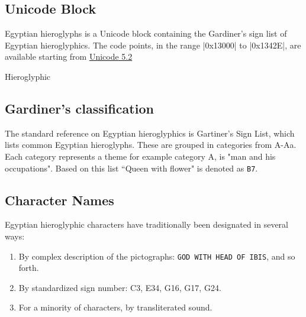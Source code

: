 \ifluatex
\bgroup
\centering 
\aegyptus
\scalebox{7}{\char"F300C}
\scalebox{7}{\char"F3001}
\scalebox{7}{\char"F3010}
\scalebox{7}{\char"F308B}
\scalebox{7}{\char"F3097}
\scalebox{7}{\char"F3091}
\egroup

\fi


\subsection{Unicode Block}

Egyptian hieroglyphs is a Unicode block containing the Gardiner's sign list of Egyptian hieroglyphics.
The code points, in the range |0x13000| to |0x1342E|, are available starting from
\href{http://unicode.org/charts/PDF/U13000.pdf}{Unicode 5.2}

\begin{scriptexample}[]{Hieroglyphic}
\bgroup
{}
\egroup
\end{scriptexample}

\subsection{Gardiner's classification}

The standard reference on Egyptian hieroglyphics is Gartiner's Sign List, which lists common Egyptian hieroglyphs. These are grouped in categories from A-Aa. Each category represents a theme for example category A, is "man and his occupations". Based on this list ``Queen with flower" is denoted as \texttt{B7}. 

\subsection{Character Names} 

Egyptian hieroglyphic characters have traditionally been designated in
several ways:

\begin{enumerate}
\item  By complex description of the pictographs: \texttt{GOD WITH HEAD OF IBIS}, and so forth.
\item By standardized sign number: C3, E34, G16, G17, G24.
\item For a minority of characters, by transliterated sound.
\end{enumerate}

